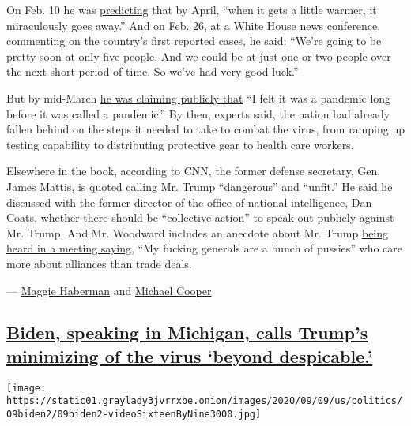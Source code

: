 On Feb. 10 he was
\href{https://factba.se/transcript/donald-trump-speech-kag-rally-manchester-new-hampshire-february-10-2020}{predicting}
that by April, ``when it gets a little warmer, it miraculously goes
away.'' And on Feb. 26, at a White House news conference, commenting on
the country's first reported cases, he said: ``We're going to be pretty
soon at only five people. And we could be at just one or two people over
the next short period of time. So we've had very good luck.''

But by mid-March
\href{https://www.nytimes3xbfgragh.onion/2020/03/17/us/politics/trump-coronavirus.html}{he
was claiming publicly that} ``I felt it was a pandemic long before it
was called a pandemic.'' By then, experts said, the nation had already
fallen behind on the steps it needed to take to combat the virus, from
ramping up testing capability to distributing protective gear to health
care workers.

Elsewhere in the book, according to CNN, the former defense secretary,
Gen. James Mattis, is quoted calling Mr. Trump ``dangerous'' and
``unfit.'' He said he discussed with the former director of the office
of national intelligence, Dan Coats, whether there should be
``collective action'' to speak out publicly against Mr. Trump. And Mr.
Woodward includes an anecdote about Mr. Trump
\href{https://www.nytimes3xbfgragh.onion/2020/09/09/us/politics/trump-generals-attacks.html}{being
heard in a meeting saying}, ``My fucking generals are a bunch of
pussies'' who care more about alliances than trade deals.

--- \href{https://www.nytimes3xbfgragh.onion/by/maggie-haberman}{Maggie
Haberman} and
\href{https://www.nytimes3xbfgragh.onion/by/michael-cooper}{Michael
Cooper}

\hypertarget{biden-speaking-in-michigan-calls-trumps-minimizing-of-the-virus-beyond-despicable}{%
\subsection{\texorpdfstring{\protect\hyperlink{biden-speaking-in-michigan-calls-trumps-minimizing-of-the-virus-beyond-despicable}{Biden,
speaking in Michigan, calls Trump's minimizing of the virus `beyond
despicable.'}}{Biden, speaking in Michigan, calls Trump's minimizing of the virus `beyond despicable.'}}\label{biden-speaking-in-michigan-calls-trumps-minimizing-of-the-virus-beyond-despicable}}

\texttt{[image: https://static01.graylady3jvrrxbe.onion/images/2020/09/09/us/politics/09biden2/09biden2-videoSixteenByNine3000.jpg]}

